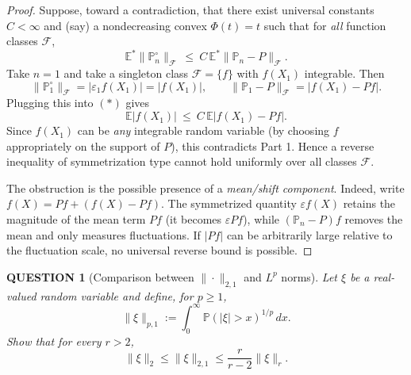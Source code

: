 \documentclass[12pt]{article}
\renewcommand{\(}{\left(}%
\renewcommand{\)}{\right)}%
\renewcommand{\[}{\left[}%
\renewcommand{\]}{\right]}%
\newtheorem{question}{QUESTION}[section]}
\newtheorem{proof}{Proof.}}
\begin{document}
\begin{proof}
Suppose, toward a contradiction, that there exist universal constants $C<\infty$ and (say) a nondecreasing
convex $\Phi(t)=t$ such that for \emph{all} function classes $\mathcal F$,
\begin{equation*}
\mathbb E^*\big\| \mathbb P_n^\circ \big\|_{\mathcal F}
\ \le\
C\,\mathbb E^*\big\| \mathbb P_n-P \big\|_{\mathcal F}.
\tag{$*$}
\end{equation*}
Take $n=1$ and take a singleton class $\mathcal F=\{f\}$ with $f(X_1)$ integrable. Then
\begin{equation*}
\|\mathbb P_1^\circ\|_{\mathcal F}
=
|\varepsilon_1 f(X_1)|
=
|f(X_1)|,
\qquad
\|\mathbb P_1-P\|_{\mathcal F}
=
|f(X_1)-Pf|.
\end{equation*}
Plugging this into $(*)$ gives
\begin{equation*}
\mathbb E|f(X_1)|
\ \le\
C\,\mathbb E|f(X_1)-Pf|.
\end{equation*}
Since $f(X_1)$ can be \emph{any} integrable random variable (by choosing $f$ appropriately on the support of
$P$), this contradicts Part 1. Hence a reverse inequality of symmetrization type cannot hold uniformly over
all classes $\mathcal F$.

The obstruction is the possible presence of a \emph{mean/shift component}. Indeed, write
$f(X)=Pf+(f(X)-Pf)$. The symmetrized quantity $\varepsilon f(X)$ retains the magnitude of the mean term
$Pf$ (it becomes $\varepsilon Pf$), while $(\mathbb P_n-P)f$ removes the mean and only measures
fluctuations. If $|Pf|$ can be arbitrarily large relative to the fluctuation scale, no universal reverse bound
is possible.
\end{proof} 

\begin{question}[Comparison between $\|\cdot\|_{2,1}$ and $L^p$ norms]
Let $\xi$ be a real-valued random variable and define, for $p \ge 1$,
\begin{equation*}
\|\xi\|_{p,1}
:=
\int_{0}^{\infty}
\mathbb P(|\xi| > x)^{1/p}\,dx.
\end{equation*}
Show that for every $r>2$,
\begin{equation*}
\|\xi\|_2 \le \|\xi\|_{2,1}
\le
\frac{r}{r-2}\|\xi\|_r.
\end{equation*}
\end{question}
\end{document}
